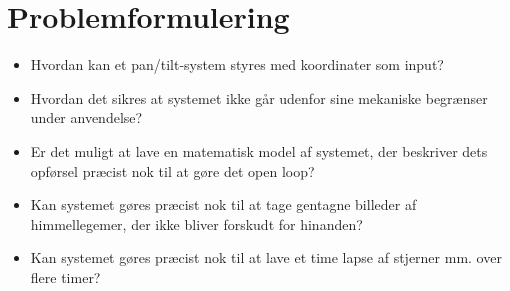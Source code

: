 \newpage
\section{Problemformulering}

\begin{itemize}[noitemsep]
	\item	Hvordan kan et pan/tilt-system styres med koordinater som input?
	\item	Hvordan det sikres at systemet ikke går udenfor sine mekaniske begrænser under anvendelse?
	\item 	Er det muligt at lave en matematisk model af systemet, der beskriver dets opførsel præcist nok til at gøre det open loop?
	\item   Kan systemet gøres præcist nok til at tage gentagne billeder af himmellegemer, der ikke bliver forskudt for hinanden?
	\item 	Kan systemet gøres præcist nok til at lave et time lapse af stjerner mm. over flere timer?
\end{itemize}
